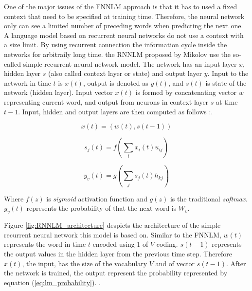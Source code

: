 One of the major issues of the \ac{FNNLM}  approach is that
it has to used a fixed context that need to be specified at training time.
Therefore, the neural network only can see a limited number of preceding words when
predicting the next one.  A language model based on recurrent neural networks  do not use a context
with a size limit.  By using recurrent connection the information cycle
inside the networks for arbitraily long time. the \ac{RNNLM} proposed by
Mikolov use the so-called simple
recurrent neural network model. The network has an input layer $x$, hidden
layer $s$ (also called context layer or state) and output layer $y$. Input to
the network in time $t$ is $x(t)$, output is denoted as $y(t)$, and $s(t)$ is
state of the network (hidden layer). Input vector $x(t)$ is formed by
concatenating vector $w$ representing current word, and output from neurons in
context layer $s$ at time $t - 1$. Input, hidden and output layers are then
computed as follows \cite{conf/interspeech/MikolovKBCK10}:.

\begin{equation} x(t) = (w(t), s(t-1))  \end{equation} 

\begin{equation} s_j(t) = f \left( \sum_{i}{x_i(t)u_{ij}}
  \right)   \end{equation}

\begin{equation}  y_v(t) = g \left( \sum_{j}{s_j(t)h_{kj}}
  \right)   \end{equation}


Where   $f(z)$ is \textit{sigmoid} activation function and $g(z)$  is the
traditional   \textit{softmax}.  $y_v(t)$ represents the probability of that
the next word is $W_v$.

Figure \ref{fig:RNNLM_architecture} despicts the architecture of the simple
recurrent neural network this model is based on. Similar to the \ac{FNNLM},    $w(t)$ represents the word in time $t$ encoded using 1-of-$V$ coding.  $s(t-1)$ represents the output values in the
hidden layer from the previous time step. Therefore $x(t)$, the input, has
the size of the vocabulary $V$ and of vector $s(t-1)$. After the network is
trained, the output represent the probability represented by equation (\ref{eq:lm_probability}).  \cite{mikolovphd2012}.

